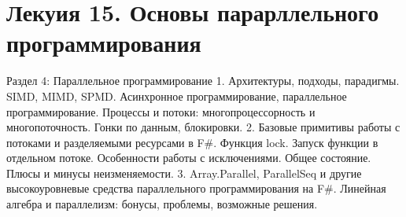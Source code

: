 \section{Лекуия 15. Основы парарллельного программирования}

Раздел 4: Параллельное программирование
    1. Архитектуры, подходы, парадигмы. SIMD, MIMD, SPMD. Асинхронное программирование, параллельное программирование. Процессы и потоки: многопроцессорность и многопоточность. Гонки по данным, блокировки.  
    2. Базовые примитивы работы с потоками и разделяемыми ресурсами в F\#. Функция lock. Запуск функции в отдельном потоке. Особенности работы с исключениями. Общее состояние. Плюсы и минусы неизменяемости.
    3. Array.Parallel, ParallelSeq и другие высокоуровневые средства параллельного программирования на F\#. Линейная алгебра и параллелизм: бонусы, проблемы, возможные решения.
